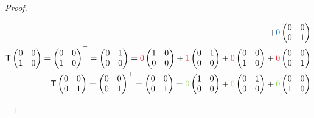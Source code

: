 \begin{proof}
\begin{enumerate}
\begin{align*}
        + \BLUE{0} \begin{pmatrix} 0 & 0 \\ 0 & 1 \end{pmatrix} \\
    \T \begin{pmatrix} 0 & 0 \\ 1 & 0 \end{pmatrix}
        = \begin{pmatrix} 0 & 0 \\ 1 & 0 \end{pmatrix}^\top
        = \begin{pmatrix} 0 & 1 \\ 0 & 0 \end{pmatrix}
        = \RED{0} \begin{pmatrix} 1 & 0 \\ 0 & 0 \end{pmatrix}
        + \RED{1} \begin{pmatrix} 0 & 1 \\ 0 & 0 \end{pmatrix}
        + \RED{0} \begin{pmatrix} 0 & 0 \\ 1 & 0 \end{pmatrix}
        + \RED{0} \begin{pmatrix} 0 & 0 \\ 0 & 1 \end{pmatrix} \\
    \T \begin{pmatrix} 0 & 0 \\ 0 & 1 \end{pmatrix}
        = \begin{pmatrix} 0 & 0 \\ 0 & 1 \end{pmatrix}^\top
        = \begin{pmatrix} 0 & 0 \\ 0 & 1 \end{pmatrix}
        = \GREEN{0} \begin{pmatrix} 1 & 0 \\ 0 & 0 \end{pmatrix}
        + \GREEN{0} \begin{pmatrix} 0 & 1 \\ 0 & 0 \end{pmatrix}
        + \GREEN{0} \begin{pmatrix} 0 & 0 \\ 1 & 0 \end{pmatrix}

\end{align*}
\end{enumerate}
\end{proof}
